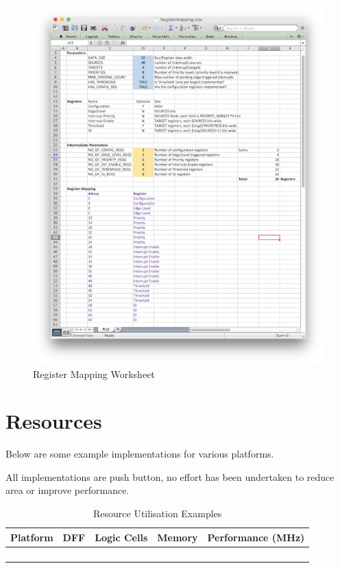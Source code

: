 \documentclass[]{article}
\begin{document}
\begin{figure}[h]
\centering
\includegraphics{../assets/graphics/AHB-Lite_PLIC_Worksheet.png}
\caption{Register Mapping Worksheet}
\end{figure}

\section{Resources}

Below are some example implementations for various platforms.

All implementations are push button, no effort has been undertaken to
reduce area or improve performance.

\begin{longtable}[]{@{}lllll@{}}
\toprule
\textbf{Platform} & \textbf{DFF} & \textbf{Logic Cells} &
\textbf{Memory} & \textbf{Performance (MHz)}\tabularnewline
\midrule
\endhead
& & & &\tabularnewline
& & & &\tabularnewline
& & & &\tabularnewline
\bottomrule
\caption{Resource Utilisation Examples}
\label{tab:RESOURCES}
\end{longtable}
\end{document}
